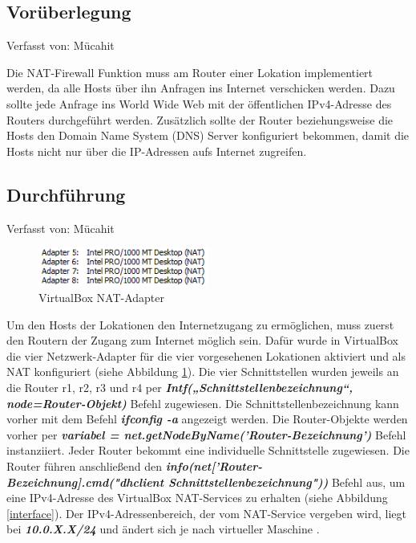 \documentclass[fontsize=12pt,paper=a4,open=any,parskip=half,
  twoside=false,toc=listof,toc=bibliography,fleqn,leqno,
  captions=nooneline,captions=tableabove,british]{scrbook}
\begin{document}
\subsection{Vorüberlegung}
{\tiny Verfasst von: Mücahit\par}
Die NAT-Firewall Funktion muss am Router einer Lokation implementiert werden, da alle Hosts über ihn Anfragen ins Internet verschicken werden. Dazu sollte jede Anfrage ins World Wide Web mit der öffentlichen IPv4-Adresse des Routers durchgeführt werden. Zusätzlich sollte der Router beziehungsweise die Hosts den Domain Name System (DNS) Server konfiguriert bekommen, damit die Hosts nicht nur über die IP-Adressen aufs Internet zugreifen.

\subsection{Durchführung}
{\tiny Verfasst von: Mücahit\par}
\begin{figure}
	\vspace{-\baselineskip}
 	\centering
 	\includegraphics[width=0.5\textwidth]{Bilder/adapter}
 	\captionsetup{justification=centering}
 	\caption{VirtualBox NAT-Adapter}
	\label{adapter}
\end{figure}

Um den Hosts der Lokationen den Internetzugang zu ermöglichen, muss zuerst den Routern der Zugang zum Internet möglich sein. Dafür wurde in VirtualBox die vier Netzwerk-Adapter für die vier vorgesehenen Lokationen aktiviert und als NAT konfiguriert (siehe Abbildung \ref{adapter}). 
Die vier Schnittstellen wurden jeweils an die Router r1, r2, r3 und r4 per \textit{\textbf{Intf(„Schnittstellenbezeichnung“, node=Router-Objekt)}} Befehl zugewiesen. Die Schnittstellenbezeichnung kann vorher mit dem Befehl \textit{\textbf{ifconfig -a}} angezeigt werden. Die Router-Objekte werden vorher per \textit{\textbf{variabel = net.getNodeByName('Router-Bezeichnung')}} Befehl instanziiert. Jeder Router bekommt eine individuelle Schnittstelle zugewiesen. Die Router führen anschließend den \textit{\textbf{info(net['Router-Bezeichnung].cmd("dhclient Schnittstellenbezeichnung"))}} Befehl aus, um eine IPv4-Adresse des VirtualBox NAT-Services zu erhalten (siehe Abbildung \ref{interface}). Der IPv4-Adressenbereich, der vom NAT-Service vergeben wird, liegt bei \textit{\textbf{10.0.X.X/24}} und ändert sich je nach virtueller Maschine \cite{NATing} \cite{NATgateway}.
\end{document}
